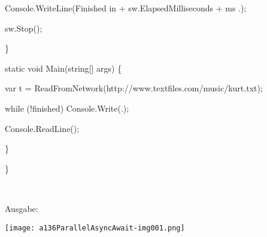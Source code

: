  Console.WriteLine({\textquotedbl}Finished in {\textquotedbl} + sw.ElapsedMilliseconds + {\textquotedbl}ms .{\textquotedbl});  

 sw.Stop();

 \}

 static void Main(string[] args)  \{

 var  t = ReadFromNetwork({\textquotedbl}http://www.textfiles.com/music/kurt.txt{\textquotedbl});

 while (!finished) Console.Write({\textquotedbl}.{\textquotedbl});  

 Console.ReadLine();  

 \}

 \}

~

Ausgabe:

 \texttt{[image: a136ParallelAsyncAwait-img001.png]} 
\endinput
